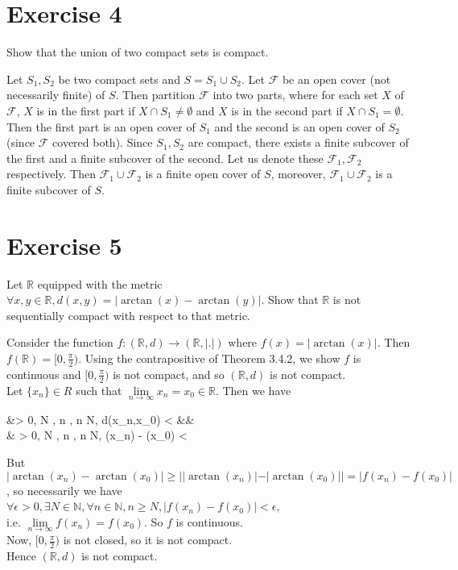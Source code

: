 \documentclass[12pt,a4paper]{article}
\newcommand{\N}{\mathbb{N}}
\newcommand{\R}{\mathbb{R}}
\newcommand{\F}{\mathcal{F}}
\theoremstyle{plain}
\theoremstyle{remark}
\theoremstyle{definition}
\begin{document}
\pagebreak	
\section*{Exercise 4}

\begin{ques}
	Show that the union of two compact sets is compact.
\end{ques}
	
	Let $S_1, S_2$ be two compact sets and $S = S_1 \cup S_2$. Let $\F$ be an open cover (not necessarily finite) of $S$. Then partition $\F$ into two parts, where for each set $X$ of $\F$, $X$ is in the first part if $X \cap S_1 \neq \emptyset$ and $X$ is in the second part if $X \cap S_1 = \emptyset$. Then the first part is an open cover of $S_1$ and the second is an open cover of $S_2$ (since $\F$ covered both). Since $S_1,S_2$ are compact, there exists a finite subcover of the first and a finite subcover of the second. Let us denote these $\F_1, \F_2$ respectively. Then $\F_1 \cup \F_2$ is a finite open cover of $S$, moreover, $\F_1 \cup \F_2$ is a finite subcover of $S$.
	
\section*{Exercise 5}

\begin{ques}
	Let $\R$ equipped with the metric $\forall x,y\in \R, d(x,y) = \vert \arctan(x) - \arctan(y) \vert$. Show that $\R$ is not sequentially compact with respect to that metric.
\end{ques}
	
	Consider the function $f:(\R,d) \rightarrow (\R,\vert.\vert)$ where $f(x) = \vert \arctan(x) \vert$. Then $f(\R) = [0,\frac{\pi}{2})$. Using the contrapositive of Theorem 3.4.2, we show $f$ is continuous and $[0,\frac{\pi}{2})$ is not compact, and so $(\R,d)$ is not compact.\\
	Let $\{x_n\} \in R$ such that $\lim\limits_{n \rightarrow \infty}x_n = x_0 \in \R$. Then we have
	\begin{flalign*}
	&\forall \epsilon > 0, \exists N \in \N, \forall n \in \N, n \ge N, d(x_n,x_0) < \epsilon &&\\
	\Longleftrightarrow & \forall \epsilon > 0, \exists N \in \N, \forall n \in \N, n \ge N, \vert \arctan(x_n) - \arctan(x_0) \vert < \epsilon
	\end{flalign*}
	But $\vert \arctan(x_n) - \arctan(x_0) \vert \ge \vert \vert \arctan(x_n) \vert - \vert \arctan(x_0) \vert \vert = \vert f(x_n) - f(x_0) \vert$, so necessarily we have\\
	$\forall \epsilon > 0, \exists N \in \N, \forall n \in \N, n \ge N, \vert f(x_n) - f(x_0) \vert < \epsilon$,\\
	i.e. $\lim\limits_{n \rightarrow \infty}f(x_n) = f(x_0)$. So $f$ is continuous.\\
	Now, $[0,\frac{\pi}{2})$ is not closed, so it is not compact.\\
	Hence $(\R,d)$ is not compact.
	
\end{document}
